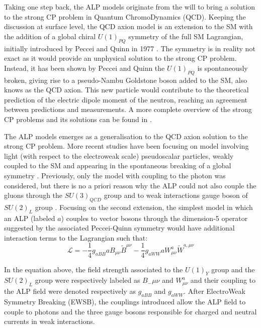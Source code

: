 		Taking one step back, the ALP models originate from the will to bring a solution to the strong CP problem in Quantum ChromoDynamics (QCD). Keeping the discussion at surface level, the QCD axion model is an extension to the SM with the addition of a global chiral $U(1)_{PQ}$ symmetry of the full SM Lagrangian, initially introduced by Peccei and Quinn in 1977 \cite{QCD_axion_PecceiQuinn}. The symmetry is in reality not exact as it would provide an unphysical solution to the strong CP problem. Instead, it has been shown by Peccei and Quinn the $U(1)_{PQ}$ is spontaneously broken, giving rise to a pseudo-Nambu Goldstone boson added to the SM, also knows as the QCD axion. This new particle would contribute to the theoretical prediction of the electric dipole moment of the neutron, reaching an agreement between predictions and measurements. A more complete overview of the strong CP problems and its solutions can be found in \cite{Moretti_MasterThesis}.
		
		The ALP models emerges as a generalisation to the QCD axion solution to the strong CP problem. More recent studies have been focusing on model involving light (with respect to the electroweak scale) pseudoscalar particles, weakly coupled to the SM and appearing in the spontaneous breaking of a global symmetry \cite{ALPs_general}. Previously, only the model with coupling to the photon was considered, but there is no a priori reason why the ALP could not also couple the gluons through the $SU(3)_{QCD}$ group and to weak interactions gauge boson of $SU(2)_L$ group \cite{Moretti_MasterThesis}. Focusing on the second extension, the simplest model in which an ALP (labeled $a$) couples to vector bosons through the dimension-5 operator suggested by the associated Peccei-Quinn symmetry would have additional interaction terms to the Lagrangian such that: 
		\begin{equation}
			\mathcal{L} = -\frac{1}{4} g_{aBB} a B_{\mu\nu} \tilde{B}^{\mu\nu} - \frac{1}{4} g_{aWW} a W_{\mu\nu}^a \tilde{W}^{a,\mu\nu}
		\end{equation} 
		
		In the equation above, the field strength associated to the $U(1)_Y$ group and the $SU(2)_L$ group were respectively labeled as $B_-{\mu \nu}$ and $W_{\mu\nu}^a$ and their coupling to the ALP field were denoted respectively as $g_{aBB}$ and $g_{aWW}$. After ElectroWeak Symmetry Breaking (EWSB), the couplings introduced allow the ALP field to couple to photons and the three gauge bosons responsible for charged and neutral currents in weak interactions. 
		
